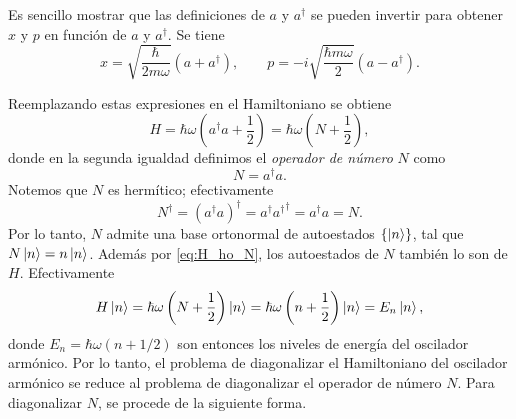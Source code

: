 \documentclass[10pt, a4paper]{article}
\newcommand{\xprefactsq}{\frac{\hbar}{2m\omega}}
\newcommand{\xprefact}{\sqrt{\xprefactsq}}
\newcommand{\pprefactsq}{\frac{\hbar m \omega}{2}}
\newcommand{\pprefact}{\sqrt{\pprefactsq}}
\newcommand{\Nexpr}{a^\dagger a}
\newcommand{\N}{N}
\numberwithin{equation}{subsection}
\begin{document}
Es sencillo mostrar que las definiciones de $a$ y $a^\dagger$ se pueden
invertir para obtener $x$ y $p$ en función de $a$ y $a^\dagger$. Se tiene
\begin{equation} \label{eq:xp_aad}
  x = \xprefact\left(a + a^\dagger\right), \qquad
  p = -i\pprefact\left(a - a^\dagger\right).
\end{equation}

Reemplazando estas expresiones en el Hamiltoniano se obtiene
\begin{equation} \label{eq:H_ho_N}
  H = \hbar\omega\left(\Nexpr + \frac{1}{2}\right)
    = \hbar\omega\left(\N + \frac{1}{2}\right),
\end{equation}
donde en la segunda igualdad definimos el \emph{operador de número} $\N$ como
\begin{equation}
  \N = \Nexpr.
\end{equation}
Notemos que $\N$ es hermítico; efectivamente
\begin{equation}
  \N^\dagger = \left(\Nexpr\right)^\dagger = a^\dagger {a^\dagger}^\dagger =
    \Nexpr = \N.
\end{equation}
Por lo tanto, $\N$ admite una base ortonormal de autoestados $\set{\ket{n}}$,
tal que $\N\ket{n} = n\ket{n}$. Además por \eqref{eq:H_ho_N}, los autoestados
de $\N$ también lo son de $H$. Efectivamente
\begin{equation}
  H\ket{n} = \hbar\omega\left(\N + \frac{1}{2}\right)\ket{n}
           = \hbar\omega\left(n + \frac{1}{2}\right)\ket{n}
           = E_n\ket{n},
\end{equation}
donde $E_n = \hbar\omega\left(n + 1/2\right)$ son entonces los niveles de
energía del oscilador armónico. Por lo tanto, el problema de diagonalizar el
Hamiltoniano del oscilador armónico se reduce al problema de diagonalizar el
operador de número $\N$. Para diagonalizar $\N$, se procede de la siguiente
forma.
\end{document}

